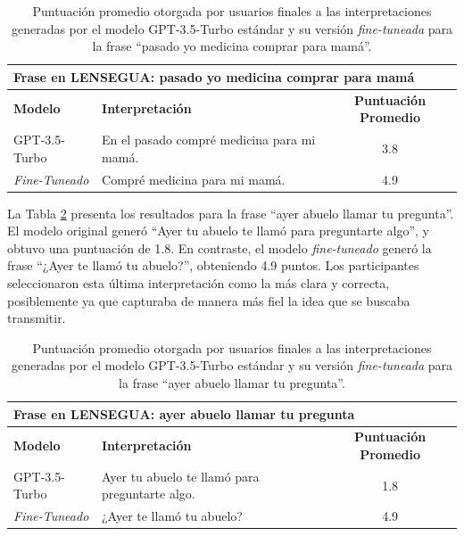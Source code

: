 \vspace{0.5cm}
\begin{table}[H]
\centering
    \begin{tabular}{|l|p{7cm}|c|}
        \hline
        \multicolumn{3}{|l|}{\textbf{Frase en LENSEGUA:} pasado yo medicina comprar para mamá} \\ \hline \hline
        \textbf{Modelo} & \textbf{Interpretación} & \textbf{Puntuación Promedio} \\ \hline
        GPT-3.5-Turbo & En el pasado compré medicina para mi mamá. & 3.8 \\ \hline
        \textit{Fine-Tuneado} & Compré medicina para mi mamá. & 4.9 \\ \hline
    \end{tabular}
    \caption{Puntuación promedio otorgada por usuarios finales a las interpretaciones generadas por el modelo GPT-3.5-Turbo estándar y su versión \textit{fine-tuneada} para la frase “pasado yo medicina comprar para mamá”.}
    \label{tab:R2}
\end{table}

La Tabla \ref{tab:R3} presenta los resultados para la frase “ayer abuelo llamar tu pregunta”. El modelo original generó “Ayer tu abuelo te llamó para preguntarte algo”, y obtuvo una puntuación de 1.8. En contraste, el modelo \textit{fine-tuneado} generó la frase “¿Ayer te llamó tu abuelo?”, obteniendo 4.9 puntos. Los participantes seleccionaron esta última interpretación como la más clara y correcta, posiblemente ya que capturaba de manera más fiel la idea que se buscaba transmitir.

\vspace{0.5cm}
\begin{table}[H]
\centering
    \begin{tabular}{|l|p{7cm}|c|}
        \hline
        \multicolumn{3}{|l|}{\textbf{Frase en LENSEGUA:} ayer abuelo llamar tu pregunta} \\ \hline \hline
        \textbf{Modelo} & \textbf{Interpretación} & \textbf{Puntuación Promedio} \\ \hline
        GPT-3.5-Turbo & Ayer tu abuelo te llamó para preguntarte algo. & 1.8 \\ \hline
        \textit{Fine-Tuneado} & ¿Ayer te llamó tu abuelo? & 4.9 \\ \hline
    \end{tabular}
    \caption{Puntuación promedio otorgada por usuarios finales a las interpretaciones generadas por el modelo GPT-3.5-Turbo estándar y su versión \textit{fine-tuneada} para la frase “ayer abuelo llamar tu pregunta”.}
    \label{tab:R3}
\end{table}

